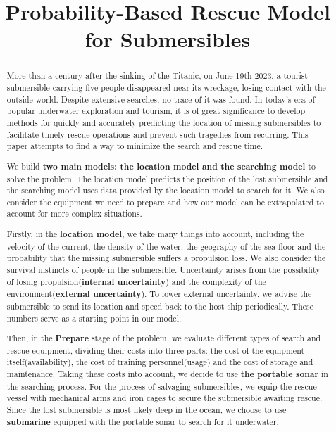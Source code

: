 \documentclass[12pt]{article}
\title{Probability-Based Rescue Model for Submersibles}
\begin{document}
\begin{abstract}
\setlength{\parskip}{0pt}
More than a century after the sinking of the Titanic, on June 19th 2023, a tourist submersible carrying five people disappeared near its wreckage, losing contact with the outside world. Despite extensive searches, no trace of it was found. In today's era of popular underwater exploration and tourism, it is of great significance to develop methods for quickly and accurately predicting the location of missing submersibles to facilitate timely rescue operations and prevent such tragedies from recurring. This paper attempts to find a way to minimize the search and rescue time. 

We build \textbf{two main models: the location model and the searching model} to solve the problem. The location model predicts the position of the lost submersible and the searching model uses data provided by the location model to search for it. We also consider the equipment we need to prepare and how our model can be extrapolated to account for more complex situations.

Firstly, in the \textbf{location model}, we take many things into account, including the velocity of the current, the density of the water, the geography of the sea floor and the probability that the missing submersible suffers a propulsion loss. We also consider the survival instincts of people in the submersible. Uncertainty arises from the possibility of losing propulsion(\textbf{internal uncertainty}) and the complexity of the environment(\textbf{external uncertainty}). To lower external uncertainty, we advise the submersible to send its location and speed back to the host ship periodically. These numbers serve as a starting point in our model. 

Then, in the \textbf{Prepare} stage of the problem, we evaluate different types of search and rescue equipment, dividing their costs into three parts: the cost of the equipment itself(availability), the cost of training personnel(usage) and the cost of storage and maintenance. Taking these costs into account, we decide to use \textbf{the portable sonar} in the searching process. For the process of salvaging submersibles, we equip the rescue vessel with mechanical arms and iron cages to secure the submersible awaiting rescue. Since the lost submersible is most likely deep in the ocean, we choose to use \textbf{submarine} equipped with the portable sonar to search for it underwater.


\end{abstract}
\end{document}
